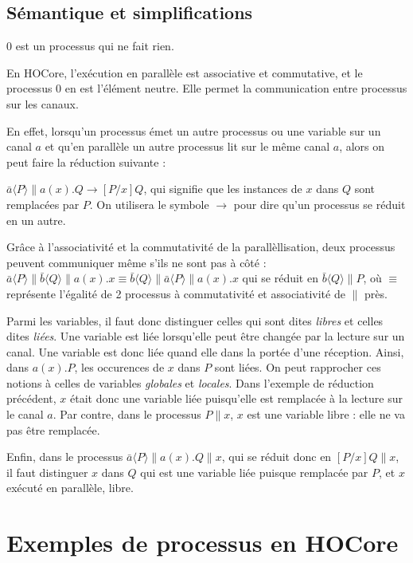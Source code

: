 \documentclass[11pt]{article}
\begin{document}
\subsection{Sémantique et simplifications}
$0$ est un processus qui ne fait rien.

En HOCore, l'exécution en parallèle est associative et commutative, et le processus $0$ en est l'élément neutre. Elle permet la communication entre processus sur les canaux.

En effet, lorsqu'un processus émet un autre processus ou une variable sur un canal $a$ et qu'en parallèle un autre processus lit sur le même canal $a$, alors on peut faire la réduction suivante :

$\bar{a}\langle P\rangle\|a(x).Q \rightarrow [P/x]Q$, qui signifie que les instances de $x$ dans $Q$ sont remplacées par $P$. On utilisera le symbole $\rightarrow$ pour dire qu'un processus se réduit en un autre.

Grâce à l'associativité et la commutativité de la parallèllisation, deux processus peuvent communiquer même s'ils ne sont pas à côté : $\bar{a}\langle P\rangle\|\bar{b}\langle Q\rangle\|a(x).x \equiv  \bar{b}\langle Q\rangle\|\bar{a}\langle P\rangle\|a(x).x$ qui se réduit en $\bar{b}\langle Q\rangle\|P$, où $\equiv$ représente l'égalité de 2 processus à commutativité et associativité de $\|$ près.

Parmi les variables, il faut donc distinguer celles qui sont dites \textit{libres} et celles dites \textit{liées}. 
Une variable est liée lorsqu'elle peut être changée par la lecture sur un canal. Une variable est donc liée quand elle dans la portée d'une réception. Ainsi, dans $a(x).P$, les occurences de $x$ dans $P$ sont liées. On peut rapprocher ces notions à celles de variables \textit{globales} et \textit{locales}.
Dans l'exemple de réduction précédent, $x$ était donc une variable liée puisqu'elle est remplacée à la lecture sur le canal $a$. Par contre, dans le processus $P\|x$, $x$ est une variable libre : elle ne va pas être remplacée. 

Enfin, dans le processus $\bar{a}\langle P\rangle\|a(x).Q\|x$,  qui se réduit donc en $[P/x]Q\|x$, il faut distinguer $x$ dans $Q$ qui est une variable liée puisque remplacée par $P$, et $x$ exécuté en parallèle, libre. 



\section{Exemples de processus en HOCore}
\end{document}

